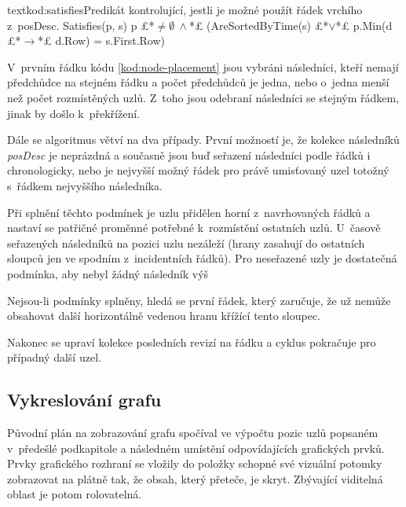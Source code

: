 \documentclass[
  biblatex,
  glossaries,
  index
]{kidiplom}
\begin{document}
\begin{kicode}{text}{kod:satisfies}{Predikát kontrolující, jestli je možné použít řádek vrchího z~posDesc.}
Satisfies(p, s)
	p £*$\neq\emptyset\ \wedge{}$*£ (AreSortedByTime(s) £*$\vee$*£ p.Min(d £*$\to$*£ d.Row) = s.First.Row)
\end{kicode}

V~prvním řádku kódu \ref{kod:node-placement} jsou vybráni následníci, kteří nemají předchůdce na stejném řádku a počet předchůdců je jedna, nebo o~jedna menší než počet rozmístěných uzlů. Z~toho jsou odebraní následníci se stejným řádkem, jinak by došlo k~překřížení.

Dále se algoritmus větví na dva případy. První možností je, že kolekce následníků {\it posDesc} je neprázdná a současně jsou buď seřazení následníci podle řádků i chronologicky, nebo je nejvyšší možný řádek pro právě umisťovaný uzel totožný s~řádkem nejvyššího následníka.

Při splnění těchto podmínek je uzlu přidělen horní z~navrhovaných řádků a nastaví se patřičné proměnné potřebné k~rozmístění ostatních uzlů. U~časově seřazených následníků na pozici uzlu nezáleží (hrany zasahují do ostatních sloupců jen ve spodním z~incidentních řádků). Pro neseřazené uzly je dostatečná podmínka, aby nebyl žádný následník výš

Nejsou-li podmínky splněny, hledá se první řádek, který zaručuje, že už nemůže obsahovat další horizontálně vedenou hranu křížící tento sloupec.

Nakonec se upraví kolekce posledních revizí na řádku a cyklus pokračuje pro případný další uzel.

%
%
%

\subsection{Vykreslování grafu}
Původní plán na zobrazování grafu spočíval ve výpočtu pozic uzlů popsaném v~předešlé podkapitole a následném umístění odpovídajících grafických prvků. Prvky grafického rozhraní se vložily do položky schopné své vizuální potomky zobrazovat na plátně tak, že obsah, který přeteče, je skryt. Zbývající viditelná oblast je potom rolovatelná.
\end{document}

